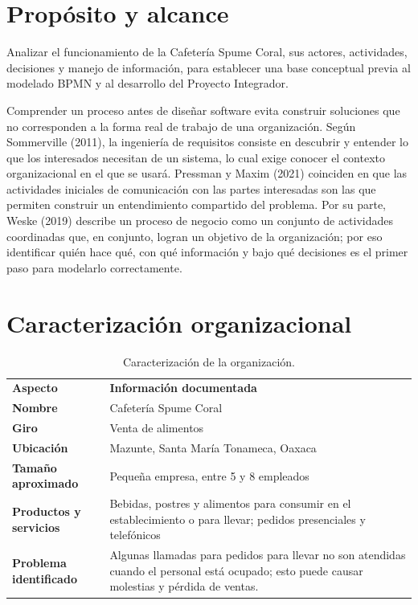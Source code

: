 \documentclass[12pt,letterpaper]{article}
\newcommand{\thd}[1]{\sffamily\bfseries #1}
\newcommand{\cab}{\rowcolor{black!18}}
\begin{document}
\tableofcontents
\clearpage
{}

\section{Propósito y alcance}

Analizar el funcionamiento de la Cafetería Spume Coral, sus actores, actividades, decisiones y manejo de información, para establecer una base conceptual previa al modelado BPMN y al desarrollo del Proyecto Integrador.

Comprender un proceso antes de diseñar software evita construir soluciones que no corresponden a la forma real de trabajo de una organización. Según Sommerville (2011), la ingeniería de requisitos consiste en descubrir y entender lo que los interesados necesitan de un sistema, lo cual exige conocer el contexto organizacional en el que se usará. Pressman y Maxim (2021) coinciden en que las actividades iniciales de comunicación con las partes interesadas son las que permiten construir un entendimiento compartido del problema. Por su parte, Weske (2019) describe un proceso de negocio como un conjunto de actividades coordinadas que, en conjunto, logran un objetivo de la organización; por eso identificar quién hace qué, con qué información y bajo qué decisiones es el primer paso para modelarlo correctamente.

\section{Caracterización organizacional}

\begin{table}[H]
\centering
\begin{tabularx}{\textwidth}{>{\bfseries}p{3.8cm}Y}
\cab \thd{Aspecto} & \thd{Información documentada}\\
Nombre & Cafetería Spume Coral\\
Giro & Venta de alimentos\\
Ubicación & Mazunte, Santa María Tonameca, Oaxaca\\
Tamaño aproximado & Pequeña empresa, entre 5 y 8 empleados\\
Productos y servicios & Bebidas, postres y alimentos para consumir en el establecimiento o para llevar; pedidos presenciales y telefónicos\\
Problema identificado & Algunas llamadas para pedidos para llevar no son atendidas cuando el personal está ocupado; esto puede causar molestias y pérdida de ventas.\\
\end{tabularx}
\caption{Caracterización de la organización.}
\end{table}
\end{document}
